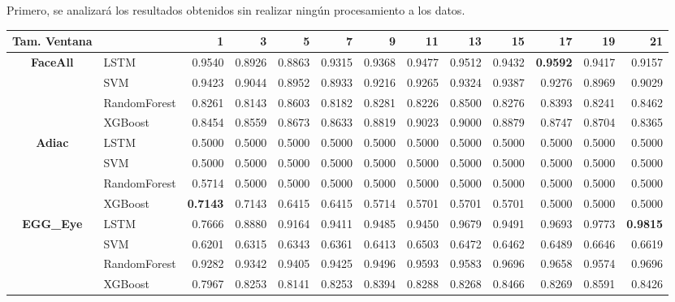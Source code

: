 Primero, se analizará los resultados obtenidos sin realizar ningún procesamiento a los datos.\newline

\begin{table}[h]
\centering
\begin{adjustbox}{max width=15cm}
\begin{tabular}{|c|l|r|r|r|r|r|r|r|r|r|r|r|}
	\hline
	\textbf{Tam. Ventana}&         &      1  &      3  &      5  &      7  &      9  &      11 &      13 &      15 &      17 &      19 &      21 \\
	\hline
	\textbf{FaceAll} & LSTM &  0.9540 &  0.8926 &  0.8863 &  0.9315 &  0.9368 &  0.9477 &  0.9512 &  0.9432 &  \textbf{0.9592} &  0.9417 &  0.9157 \\
	& SVM &  0.9423 &  0.9044 &  0.8952 &  0.8933 &  0.9216 &  0.9265 &  0.9324 &  0.9387 &  0.9276 &  0.8969 &  0.9029 \\
	& RandomForest &  0.8261 &  0.8143 &  0.8603 &  0.8182 &  0.8281 &  0.8226 &  0.8500 &  0.8276 &  0.8393 &  0.8241 &  0.8462 \\
	& XGBoost &  0.8454 &  0.8559 &  0.8673 &  0.8633 &  0.8819 &  0.9023 &  0.9000 &  0.8879 &  0.8747 &  0.8704 &  0.8365 \\
	\hline
	\textbf{Adiac} & LSTM &  0.5000 &  0.5000 &  0.5000 &  0.5000 &  0.5000 &  0.5000 &  0.5000 &  0.5000 &  0.5000 &  0.5000 &  0.5000 \\
	& SVM &  0.5000 &  0.5000 &  0.5000 &  0.5000 &  0.5000 &  0.5000 &  0.5000 &  0.5000 &  0.5000 &  0.5000 &  0.5000 \\
	& RandomForest &  0.5714 &  0.5000 &  0.5000 &  0.5000 &  0.5000 &  0.5000 &  0.5000 &  0.5000 &  0.5000 &  0.5000 &  0.5000 \\
	& XGBoost &  \textbf{0.7143} &  0.7143 &  0.6415 &  0.6415 &  0.5714 &  0.5701 &  0.5701 &  0.5701 &  0.5000 &  0.5000 &  0.5000 \\
	\hline
	\textbf{EGG\_Eye} & LSTM &  0.7666 &  0.8880 &  0.9164 &  0.9411 &  0.9485 &  0.9450 &  0.9679 &  0.9491 &  0.9693 &  0.9773 &  \textbf{0.9815} \\
	& SVM &  0.6201 &  0.6315 &  0.6343 &  0.6361 &  0.6413 &  0.6503 &  0.6472 &  0.6462 &  0.6489 &  0.6646 &  0.6619 \\
	& RandomForest &  0.9282 &  0.9342 &  0.9405 &  0.9425 &  0.9496 &  0.9593 &  0.9583 &  0.9696 &  0.9658 &  0.9574 &  0.9696 \\
	& XGBoost &  0.7967 &  0.8253 &  0.8141 &  0.8253 &  0.8394 &  0.8288 &  0.8268 &  0.8466 &  0.8269 &  0.8591 &  0.8426 \\

\end{tabular}
\end{adjustbox}
\end{table}

